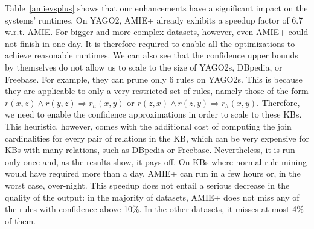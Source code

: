 Table~\ref{amievsplus} shows that our enhancements have a significant impact on the systems' runtimes.
On YAGO2, AMIE+ already exhibits a speedup factor of 6.7 w.r.t. AMIE.
For bigger and more complex datasets, however, even AMIE+  could not finish in one day. It is therefore required to enable all the optimizations to achieve reasonable runtimes.
We can also see that the confidence upper bounds by themselves do not allow us to scale to the size of YAGO2s, DBpedia, or Freebase.
For example, they can prune only 6 rules on YAGO2s.
This is because they are applicable to only a very restricted set of rules, namely those of the form $r(x,z) \wedge r(y,z) \Rightarrow r_h(x,y)$ or
$r(z,x) \wedge r(z,y) \Rightarrow r_h(x,y)$.
Therefore, we need to enable the confidence approximations in order to scale to these KBs.
This heuristic, however, comes with the additional cost of computing the
join cardinalities for every pair of relations in the KB, which can be very expensive for KBs with many relations, such as DBpedia or Freebase.
Nevertheless, it is run only once and, as the results show, it pays off.
On KBs where normal rule mining would have required more than a day, AMIE+ can run in a few hours or, in the worst case, over-night.
This speedup does not entail a serious decrease in the quality of the output: in the majority of datasets, AMIE+ does not miss any of the rules with confidence above 10\%. In the other datasets, it misses at most 4\% of them.


